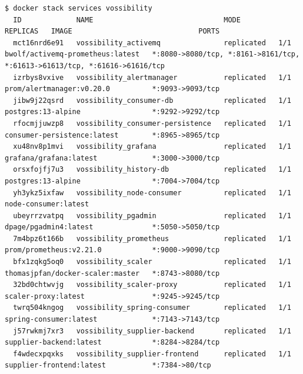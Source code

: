 \begin{lstlisting}[style=javaStyle,caption={Dockerfile - Supplier},label=lst:supplierDockerfile]
  $ docker stack services vossibility
  ID             NAME                               MODE         REPLICAS   IMAGE                              PORTS
  mct16nrd6e91   vossibility_activemq               replicated   1/1        bwolf/activemq-prometheus:latest   *:8080->8080/tcp, *:8161->8161/tcp, *:61613->61613/tcp, *:61616->61616/tcp
  izrbys8vxive   vossibility_alertmanager           replicated   1/1        prom/alertmanager:v0.20.0          *:9093->9093/tcp
  jibw9j22qsrd   vossibility_consumer-db            replicated   1/1        postgres:13-alpine                 *:9292->9292/tcp
  rfocmjjuwzp8   vossibility_consumer-persistence   replicated   1/1        consumer-persistence:latest        *:8965->8965/tcp
  xu48nv8p1mvi   vossibility_grafana                replicated   1/1        grafana/grafana:latest             *:3000->3000/tcp
  orsxfojfj7u3   vossibility_history-db             replicated   1/1        postgres:13-alpine                 *:7004->7004/tcp
  yh3ykz5ixfaw   vossibility_node-consumer          replicated   1/1        node-consumer:latest
  ubeyrrzvatpq   vossibility_pgadmin                replicated   1/1        dpage/pgadmin4:latest              *:5050->5050/tcp
  7m4bpz6t166b   vossibility_prometheus             replicated   1/1        prom/prometheus:v2.21.0            *:9000->9090/tcp
  bfx1zqkg5oq0   vossibility_scaler                 replicated   1/1        thomasjpfan/docker-scaler:master   *:8743->8080/tcp
  32bd0chtwvjg   vossibility_scaler-proxy           replicated   1/1        scaler-proxy:latest                *:9245->9245/tcp
  twrq504kngog   vossibility_spring-consumer        replicated   1/1        spring-consumer:latest             *:7143->7143/tcp
  j57rwkmj7xr3   vossibility_supplier-backend       replicated   1/1        supplier-backend:latest            *:8284->8284/tcp
  f4wdecxpqxks   vossibility_supplier-frontend      replicated   1/1        supplier-frontend:latest           *:7384->80/tcp
\end{lstlisting}







\renewcommand\theadalign{bc}
\renewcommand\theadfont{\bfseries}
\renewcommand\theadgape{\Gape[4pt]}
\renewcommand\cellgape{\Gape[4pt]}





